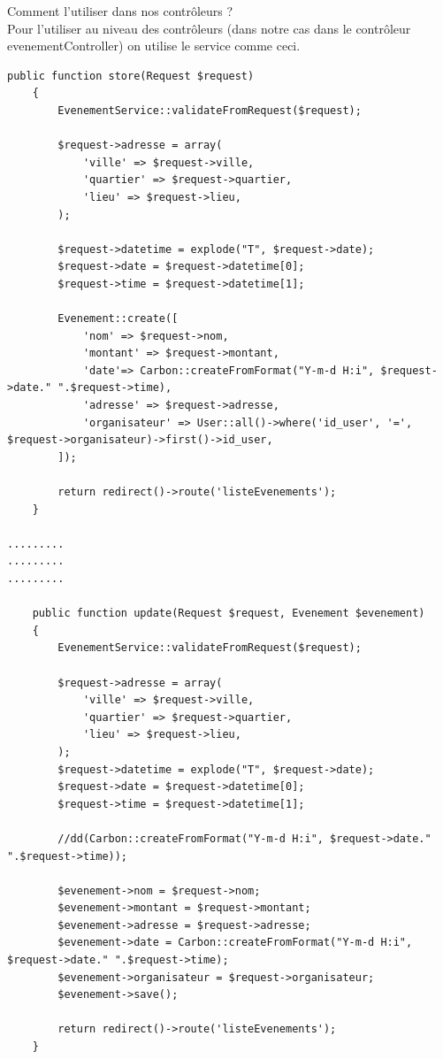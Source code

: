 \documentclass[12pt,a4paper]{article}
\begin{document}
Comment l'utiliser dans nos contrôleurs ?\\
Pour l'utiliser au niveau des contrôleurs (dans notre cas dans le contrôleur evenementController) on utilise le service comme
ceci.
\begin{verbatim}
public function store(Request $request)
    {
        EvenementService::validateFromRequest($request);

        $request->adresse = array(
            'ville' => $request->ville,
            'quartier' => $request->quartier,
            'lieu' => $request->lieu,
        );

        $request->datetime = explode("T", $request->date);
        $request->date = $request->datetime[0];
        $request->time = $request->datetime[1];

        Evenement::create([
            'nom' => $request->nom,
            'montant' => $request->montant,
            'date'=> Carbon::createFromFormat("Y-m-d H:i", $request->date." ".$request->time),
            'adresse' => $request->adresse,
            'organisateur' => User::all()->where('id_user', '=', $request->organisateur)->first()->id_user,
        ]);

        return redirect()->route('listeEvenements');
    }

......... 
.........
.........    
    
    public function update(Request $request, Evenement $evenement)
    {
        EvenementService::validateFromRequest($request);

        $request->adresse = array(
            'ville' => $request->ville,
            'quartier' => $request->quartier,
            'lieu' => $request->lieu,
        );
        $request->datetime = explode("T", $request->date);
        $request->date = $request->datetime[0];
        $request->time = $request->datetime[1];

        //dd(Carbon::createFromFormat("Y-m-d H:i", $request->date." ".$request->time));

        $evenement->nom = $request->nom;
        $evenement->montant = $request->montant;
        $evenement->adresse = $request->adresse;
        $evenement->date = Carbon::createFromFormat("Y-m-d H:i", $request->date." ".$request->time);
        $evenement->organisateur = $request->organisateur;
        $evenement->save();

        return redirect()->route('listeEvenements');
    }
\end{verbatim}
\end{document}
